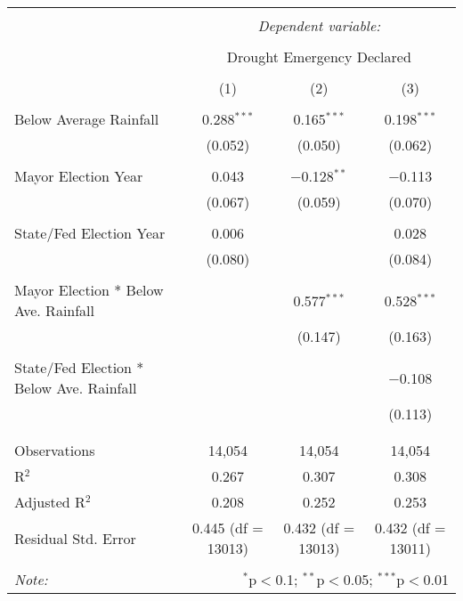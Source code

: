 
\begin{tabular}{@{\extracolsep{5pt}}lccc} 
\\[-1.8ex]\hline 
\hline \\[-1.8ex] 
 & \multicolumn{3}{c}{\textit{Dependent variable:}} \\ 
\cline{2-4} 
\\[-1.8ex] & \multicolumn{3}{c}{Drought Emergency Declared} \\ 
\\[-1.8ex] & (1) & (2) & (3)\\ 
\hline \\[-1.8ex] 
 Below Average Rainfall & 0.288$^{***}$ & 0.165$^{***}$ & 0.198$^{***}$ \\ 
  & (0.052) & (0.050) & (0.062) \\ 
  & & & \\ 
 Mayor Election Year & 0.043 & $-$0.128$^{**}$ & $-$0.113 \\ 
  & (0.067) & (0.059) & (0.070) \\ 
  & & & \\ 
 State/Fed Election Year & 0.006 &  & 0.028 \\ 
  & (0.080) &  & (0.084) \\ 
  & & & \\ 
 Mayor Election * Below Ave. Rainfall &  & 0.577$^{***}$ & 0.528$^{***}$ \\ 
  &  & (0.147) & (0.163) \\ 
  & & & \\ 
 State/Fed Election * Below Ave. Rainfall &  &  & $-$0.108 \\ 
  &  &  & (0.113) \\ 
  & & & \\ 
\hline \\[-1.8ex] 
Observations & 14,054 & 14,054 & 14,054 \\ 
R$^{2}$ & 0.267 & 0.307 & 0.308 \\ 
Adjusted R$^{2}$ & 0.208 & 0.252 & 0.253 \\ 
Residual Std. Error & 0.445 (df = 13013) & 0.432 (df = 13013) & 0.432 (df = 13011) \\ 
\hline 
\hline \\[-1.8ex] 
\textit{Note:}  & \multicolumn{3}{r}{$^{*}$p$<$0.1; $^{**}$p$<$0.05; $^{***}$p$<$0.01} \\ 
\end{tabular} 
